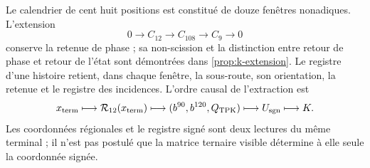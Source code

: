 Le calendrier de cent huit positions est constitué de douze fenêtres nonadiques.
L’extension
\[
 0\longrightarrow C_{12}\longrightarrow C_{108}
 \longrightarrow C_9\longrightarrow0
\]
conserve la retenue de phase ; sa non-scission et la distinction entre retour de
phase et retour de l’état sont démontrées dans
\cref{prop:k-extension}. Le registre d’une histoire retient, dans chaque
fenêtre, la sous-route, son orientation, la retenue et le registre des incidences.
L’ordre causal de l’extraction est
\begin{equation}
 x_{\rm term}\longmapsto\mathcal R_{12}(x_{\rm term})
 \longmapsto(b^{90},b^{120},Q_{\rm TPK})
 \longmapsto U_{\rm sgn}\longmapsto K.
 \label{lib01:cadena-registro}
\end{equation}
Les coordonnées régionales et le registre signé sont deux lectures du même terminal ; il n'est pas postulé que la matrice ternaire visible détermine à elle seule la coordonnée signée.

